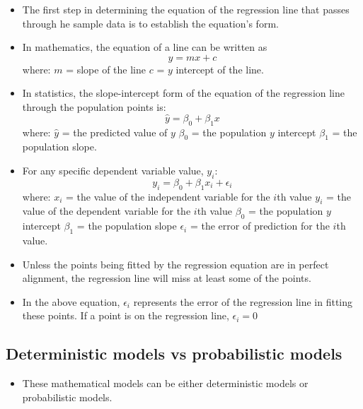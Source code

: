\documentclass[]{book}
\providecommand{\tightlist}{%
  \setlength{\itemsep}{0pt}\setlength{\parskip}{0pt}}
\begin{document}
\begin{itemize}
\item
  The first step in determining the equation of the regression line that passes through he sample data is to establish the equation's form.
\item
  In mathematics, the equation of a line can be written as
  \[y=mx+c\]
  where:
  \(m\) = slope of the line \newline 
  \(c\) = \(y\) intercept of the line.
\item
  In statistics, the slope-intercept form of the equation of the regression line through the population points is:
  \[\hat{y} = \beta_0+\beta_1x\]
  where:
  \(\hat{y}\) = the predicted value of \(y\) \newline
  \(\beta_0\) = the population \(y\) intercept \newline
  \(\beta_1\) = the population slope.
\item
  For any specific dependent variable value, \(y_i\):
  \[y_i = \beta_0+\beta_1x_i+\epsilon_i\]
  where:
  \(x_i\) = the value of the independent variable for the \(i\)th value \newline
  \(y_i\) = the value of the dependent variable for the \(i\)th value \newline
  \(\beta_0\) = the population \(y\) intercept \newline
  \(\beta_1\) = the population slope \newline
  \(\epsilon_i\) = the error of prediction for the \(i\)th value.
\item
  Unless the points being fitted by the regression equation are in perfect alignment, the regression line will miss at least some of the points.
\item
  In the above equation, \(\epsilon_i\) represents the error of the regression line in fitting these points. If a point is on the regression line, \(\epsilon_i = 0\)
\end{itemize}

\hypertarget{deterministic-models-vs-probabilistic-models}{%
\subsection{Deterministic models vs probabilistic models}\label{deterministic-models-vs-probabilistic-models}}

\begin{itemize}
\tightlist
\item
  These mathematical models can be either deterministic models or probabilistic models.
\end{itemize}
\end{document}
